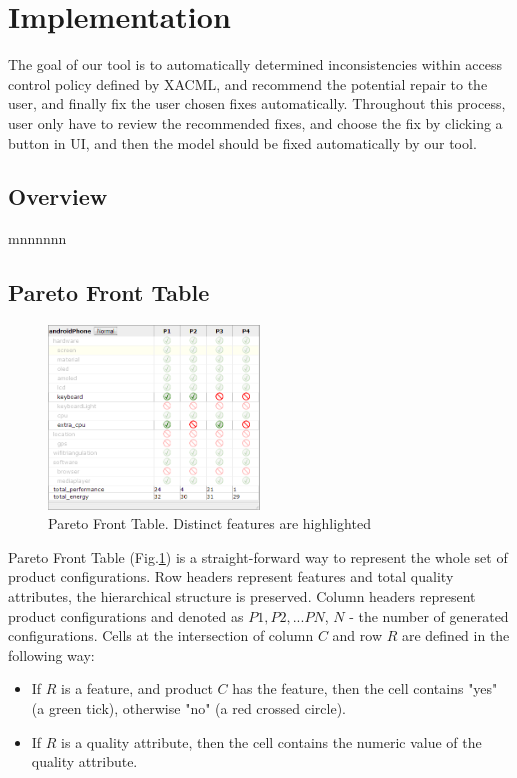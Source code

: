 \documentclass{acm_proc_article-sp}
\begin{document}
\section{Implementation}

The goal of our tool is to automatically determined inconsistencies within access control policy defined by XACML, and recommend the potential repair to the user, and finally fix the user chosen fixes automatically. Throughout this process, user only have to review the recommended fixes, and choose the fix by clicking a button in UI, and then the model should be fixed automatically by our tool. 


\subsection{Overview}

mnnnnnn  

\subsection{Pareto Front Table}

\begin{figure}[h]
\includegraphics[width=0.5\textwidth]{table.png}
\caption{Pareto Front Table. Distinct features are highlighted}    
  \label{fig:table}
\end{figure}

Pareto Front Table (Fig.\ref{fig:table}) is a straight-forward way to represent the whole set of product configurations. Row headers represent features and total quality attributes, the hierarchical structure is preserved. Column headers represent product configurations and denoted as $P1, P2, ... PN$, $N$ - the number of generated configurations. Cells at the intersection of column $C$ and row $R$ are defined in the following way:
\begin{itemize}
\item If $R$ is a feature, and product $C$ has the feature, then the cell contains "yes" (a green tick), otherwise "no" (a red crossed circle).
\item If $R$ is a quality attribute, then the cell contains the numeric value of the quality attribute.
\end{itemize}
\end{document}
